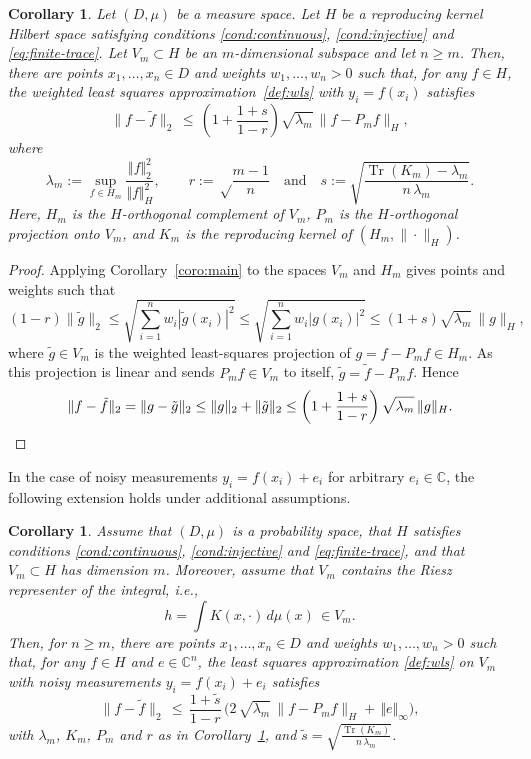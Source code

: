 \documentclass[a4paper,11pt]{article}
\renewcommand{\(}{\left (}
\renewcommand{\)}{\right )}
\newcommand{\<}{\langle}
\renewcommand{\>}{\rangle}
\newcommand{\C}{\mathbb{C}}
\newtheorem{coro}[theorem]{Corollary}
\theoremstyle{definition}
\DeclareMathOperator{\Tr}{Tr}
\begin{document}
\smallskip

\begin{coro}\label{cor:recovery}
Let $(D,\mu)$ be a measure space. 
Let $H$ be a reproducing kernel Hilbert space satisfying conditions \eqref{cond:continuous}, \eqref{cond:injective} and \eqref{eq:finite-trace}.
Let $V_m \subset H$ be an $m$-dimensional subspace and
let $n\geq m$.
Then, there are points $x_1,\hdots,x_n \in D$
and weights $w_1,\hdots,w_n>0$
such that, for any $f\in H$, the weighted least squares approximation~\eqref{def:wls} with $y_i=f(x_i)$ satisfies
\[
\big\|f- \tilde f\big\|_2 
\,\leq\, 
\left(1+\frac{1+s}{1-r}\right)\sqrt{\lambda_m} \,\big\|f-P_m f\big\|_H,
\]
where
\[
\lambda_m:=\sup_{f \in H_m} \frac{\Vert f \Vert_2^2}{\Vert f \Vert_{H}^2},
\qquad
r:=\sqrt\frac{m-1}{n}
\quad\text{and}\quad
s:=\sqrt{\frac{\Tr(K_m)-\lambda_m}{n\,\lambda_m}}.
\] 
Here, $H_m$ is the $H$-orthogonal complement of $V_m$,
$P_m$ is the $H$-orthogonal projection onto $V_m$,
and $K_m$ is the reproducing kernel of $(H_m,\|\cdot\|_H)$.
\end{coro}

\begin{proof}
Applying Corollary~\ref{coro:main} to the spaces $V_m$ and $H_m$ gives points and weights such that
\[
(1-r)\|\tilde g\|_2
\leq \sqrt{\sum_{i=1}^n w_i |\tilde g(x_i)|^2}
\leq \sqrt{\sum_{i=1}^n w_i |g(x_i)|^2}\leq (1+s)\sqrt{\lambda_m}\,\|g\|_{H},
\]
where $\tilde g\in V_m$ is the weighted least-squares projection of ${g=f-P_mf\in H_m}$.
As this projection is linear and sends $P_mf\in V_m$ to itself, $\tilde g=\tilde f-P_mf$. Hence
\[
\|f-\tilde f\|_2=\|g-\tilde g\|_2\leq \|g\|_2+\|\tilde g\|_2\leq \left(1+\frac{1+s}{1-r}\right)\sqrt{\lambda_m}\,\|g\|_{H}. \qedhere
\]
\end{proof}


In the case of noisy measurements $y_i=f(x_i)+e_i$ for arbitrary $e_i\in \C$, the following extension holds under additional assumptions.

\begin{coro}
\label{coro:noisy-recovery}
Assume that $(D,\mu)$ is a probability space, that $H$ satisfies conditions \eqref{cond:continuous}, \eqref{cond:injective} and \eqref{eq:finite-trace}, and that $V_m \subset H$ has dimension $m$. 
Moreover, assume that 
$V_m$ contains the Riesz representer of the integral, i.e., 
\[
h=\int K(x,\cdot)\,d\mu(x) \,\in V_m.
\]
Then, for $n \ge m$, 
there are points
$x_1,\hdots,x_n \in D$
and weights $w_1,\hdots,w_n>0$
such that, for any $f\in H$ and $e\in \C^n$, the least squares approximation \eqref{def:wls} on $V_m$ with noisy measurements $y_i=f(x_i)+e_i$ satisfies
\begin{equation}
\label{eq-prop-noisy}
\big\|f- \tilde f\big\|_2 
\,\leq\, 
\frac{1+\tilde s}{1-r}\, \Big(2\,\sqrt{\lambda_m} \,\big\|f-P_m f\big\|_H
+\,\Vert e \Vert_{\infty}\Big),
\end{equation}
with $\lambda_m$, $K_m$, $P_m$ and $r$ as in Corollary~\ref{cor:recovery}, 
and $\tilde s=\sqrt{\frac{\Tr(K_m)}{n\,\lambda_m}}$.
\end{coro}
\end{document}

